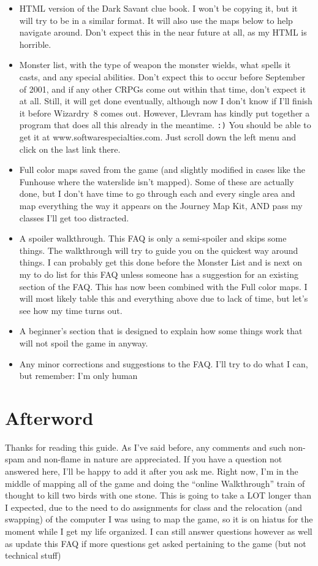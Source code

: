 \documentclass[12pt]{article}
\providecommand{\tightlist}{%
  \setlength{\itemsep}{0pt}\setlength{\parskip}{0pt}}
\begin{document}
\begin{itemize}
\tightlist
\item
  HTML version of the Dark Savant clue book. I won't be copying it, but
  it will try to be in a similar format. It will also use the maps below
  to help navigate around. Don't expect this in the near future at all,
  as my HTML is horrible.
\item
  Monster list, with the type of weapon the monster wields, what spells
  it casts, and any special abilities. Don't expect this to occur before
  September of 2001, and if any other CRPGs come out within that time,
  don't expect it at all. Still, it will get done eventually, although
  now I don't know if I'll finish it before Wizardry~8 comes out.
  However, Llevram has kindly put together a program that does all this
  already in the meantime. \texttt{:)} You should be able to get it at
  www.softwarespecialties.com. Just scroll down the left menu and click
  on the last link there.
\item
  Full color maps saved from the game (and slightly modified in cases
  like the Funhouse where the waterslide isn't mapped). Some of these
  are actually done, but I don't have time to go through each and every
  single area and map everything the way it appears on the Journey Map
  Kit, AND pass my classes I'll get too distracted.
\item
  A spoiler walkthrough. This FAQ is only a semi-spoiler and skips some
  things. The walkthrough will try to guide you on the quickest way
  around things. I can probably get this done before the Monster List
  and is next on my to do list for this FAQ unless someone has a
  suggestion for an existing section of the FAQ. This has now been
  combined with the Full color maps. I will most likely table this and
  everything above due to lack of time, but let's see how my time turns
  out.
\item
  A beginner's section that is designed to explain how some things work
  that will not spoil the game in anyway.
\item
  Any minor corrections and suggestions to the FAQ. I'll try to do what
  I can, but remember: I'm only human
\end{itemize}

\section{Afterword}\label{afterword}

Thanks for reading this guide. As I've said before, any comments and such
non-spam and non-flame in nature are appreciated. If you have a question not
answered here, I'll be happy to add it after you ask me.  Right now, I'm in
the middle of mapping all of the game and doing the ``online Walkthrough''
train of thought to kill two birds with one stone. This is going to take a
LOT longer than I expected, due to the need to do assignments for class and
the relocation (and swapping) of the computer I was using to map the game, so
it is on hiatus for the moment while I get my life organized. I can still
answer questions however as well as update this FAQ if more questions get
asked pertaining to the game (but not technical stuff)
\end{document}

